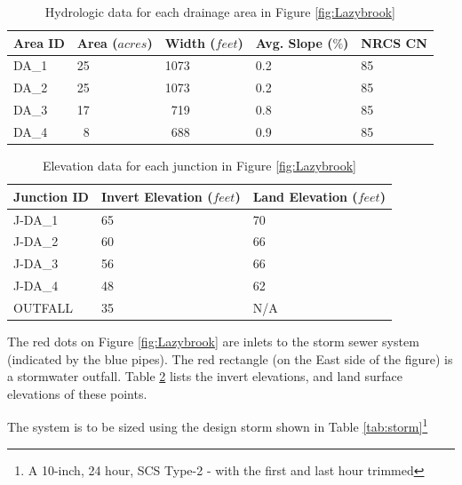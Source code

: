 \documentclass[12pt]{article}
\begin{document}
\begin{enumerate}
\begin{table}[ht!]
      \caption{Hydrologic data for each drainage area in Figure \ref{fig:Lazybrook} \\}
   \begin{tabular}{| p{0.6in} | p{0.9in} | p{0.9in} | p{1.3in} | p{1.3in} |} %
   \hline
   \hline
Area ID & Area ($acres$) & Width ($feet$) & Avg. Slope ($\%$) & NRCS CN \\
\hline
\hline
DA\_1 &  25 & 1073 & 0.2 & 85\\
DA\_2 &  25 & 1073 & 0.2 & 85\\
DA\_3 &  17 & ~719 & 0.8 & 85\\
DA\_4 &  ~8 & ~688 & 0.9 & 85\\
\hline
\hline
   \end{tabular}
   \label{tab:drainageareas}
\end{table}



\begin{table}[ht!]
      \caption{Elevation data for each junction in Figure \ref{fig:Lazybrook} \\}
   \begin{tabular}{| p{1.6in} | p{1.6in} | p{1.6in} |} %
   \hline
   \hline
Junction ID & Invert Elevation ($feet$) & Land Elevation ($feet$) \\
\hline
\hline
J-DA\_1 &  65 & 70 \\
J-DA\_2 &  60 & 66 \\
J-DA\_3 &  56 & 66 \\
J-DA\_4 &  48 & 62 \\
OUTFALL &  35 & N/A \\
\hline
\hline
   \end{tabular}
   \label{tab:junctions}
\end{table}

\clearpage
The red dots on Figure \ref{fig:Lazybrook} are inlets to the storm sewer system (indicated by the blue pipes).  The red rectangle (on the East side of the figure) is a stormwater outfall.  Table \ref{tab:junctions} lists the invert elevations, and land surface elevations of these points. 

The system is to be sized using the design storm shown in Table \ref{tab:storm}\footnote{A 10-inch, 24 hour, SCS Type-2 - with the first and last hour trimmed}


\end{enumerate}
\end{document}
